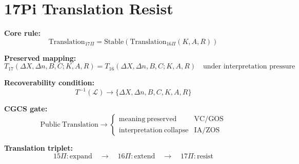 \section*{17Pi Translation Resist}

\textbf{Core rule:}
\[
\mathrm{Translation}_{17\Pi}
=
\mathrm{Stable}\left(\mathrm{Translation}_{16\Pi}(K,A,R)\right)
\]

\textbf{Preserved mapping:}
\[
T_{17}(\Delta X,\Delta n,B,C;K,A,R)
=
T_{16}(\Delta X,\Delta n,B,C;K,A,R)
\quad \text{under interpretation pressure}
\]

\textbf{Recoverability condition:}
\[
T^{-1}(\mathcal{L}) \rightarrow \{\Delta X,\Delta n,B,C,K,A,R\}
\]

\textbf{CGCS gate:}
\[
\mathrm{Public\ Translation} \rightarrow
\begin{cases}
\mathrm{meaning\ preserved} & \text{VC/GOS} \\
\mathrm{interpretation\ collapse} & \text{IA/ZOS}
\end{cases}
\]

\textbf{Translation triplet:}
\[
15\Pi:\mathrm{expand}
\quad\rightarrow\quad
16\Pi:\mathrm{extend}
\quad\rightarrow\quad
17\Pi:\mathrm{resist}
\]
